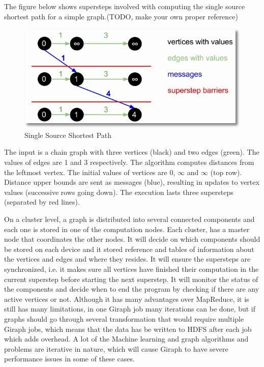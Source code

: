 \documentclass[english]{tktltiki}
\begin{document}
The figure below shows supersteps involved with computing the single source shortest path for a simple graph.(TODO, make your own proper reference)
\begin{figure}[ht!]
\centering
\includegraphics[width=130mm]{figures/giraphsuperstep.jpg}
\caption{Single Source Shortest Path}
\end{figure}

The input is a chain graph with three vertices (black) and two edges (green). The values of edges are 1 and 3 respectively. The algorithm computes distances from the leftmost vertex. The initial values of vertices are 0, $\infty$ and $\infty$ (top row). Distance upper bounds are sent as messages (blue), resulting in updates to vertex values (successive rows going down). The execution lasts three supersteps (separated by red lines).

On a cluster level, a graph is distributed into several connected components and each one is stored in one of the computation nodes. Each cluster, has a master node that coordinates the other nodes. It will decide on which components should be stored on each device and it stored reference and tables of information about the vertices and edges and where they resides. It will ensure the supersteps are synchronized, i.e. it makes sure all vertices have finished their computation in the current superstep before starting the next superstep. It will monitor the status of the components and decide when to end the program by checking if there are any active vertices or not. 
Although it has many advantages over MapReduce, it is still has many limitations, in one Giraph job many iterations can be done, but if graphs should go through several transformation that would require multiple Giraph jobs, which means that the data has be written to HDFS after each job which adds overhead. A lot of the Machine learning and graph algorithms and problems are iterative in nature, which will cause Giraph to have severe performance issues in some of these cases. 
\end{document}
